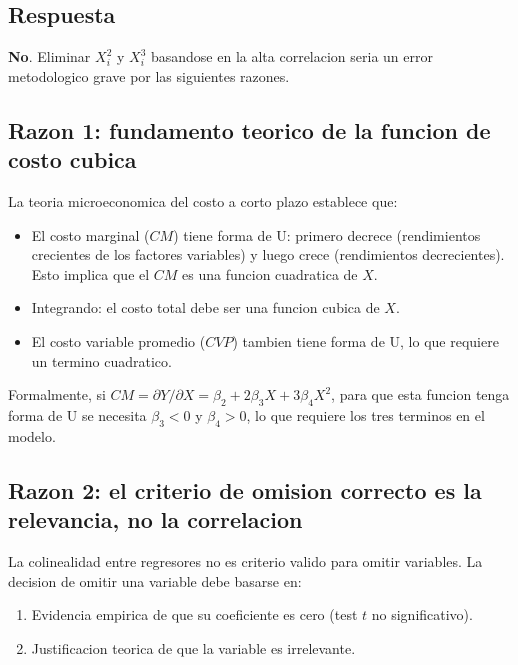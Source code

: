 \documentclass[12pt, letterpaper]{article}
\theoremstyle{remark}
\begin{document}
\subsection{Respuesta}

\textbf{No}. Eliminar $X_i^2$ y $X_i^3$ basandose en la alta correlacion
seria un error metodologico grave por las siguientes razones.

\subsection{Razon 1: fundamento teorico de la funcion de costo cubica}

La teoria microeconomica del costo a corto plazo establece que:

\begin{itemize}[leftmargin=1.6em, itemsep=4pt]
  \item El costo marginal ($CM$) tiene forma de U: primero decrece
    (rendimientos crecientes de los factores variables) y luego crece
    (rendimientos decrecientes). Esto implica que el $CM$ es una funcion
    cuadratica de $X$.
  \item Integrando: el costo total debe ser una funcion cubica de $X$.
  \item El costo variable promedio ($CVP$) tambien tiene forma de U, lo que
    requiere un termino cuadratico.
\end{itemize}

Formalmente, si $CM = \partial Y/\partial X = \beta_2 + 2\beta_3 X + 3\beta_4 X^2$,
para que esta funcion tenga forma de U se necesita $\beta_3 < 0$ y $\beta_4 > 0$,
lo que requiere los tres terminos en el modelo.

\subsection{Razon 2: el criterio de omision correcto es la relevancia, no la correlacion}

La colinealidad entre regresores no es criterio valido para omitir variables.
La decision de omitir una variable debe basarse en:

\begin{enumerate}[leftmargin=1.8em, itemsep=4pt]
  \item Evidencia empirica de que su coeficiente es cero (test $t$ no significativo).
  \item Justificacion teorica de que la variable es irrelevante.
\end{enumerate}
\end{document}
